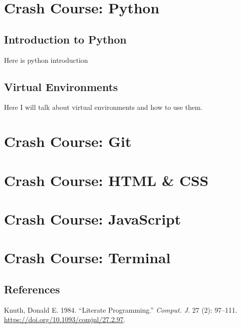 \documentclass[
  letterpaper,
  DIV=11,
  numbers=noendperiod]{scrreprt}
\newlength{\cslhangindent}
\newlength{\cslentryspacingunit} %
\newenvironment{CSLReferences}[2] %
 {%
  \setlength{\parindent}{0pt}
  \ifodd #1
  \let\oldpar\par
  \def\par{\hangindent=\cslhangindent\oldpar}
  \fi
  \setlength{\parskip}{#2\cslentryspacingunit}
 }%
 {}
\begin{document}
\part{Crash Course: Python}

\hypertarget{introduction-to-python}{%
\chapter{Introduction to Python}\label{introduction-to-python}}

Here is python introduction

\hypertarget{sec-virtual-environments}{%
\chapter{Virtual Environments}\label{sec-virtual-environments}}

Here I will talk about virtual environments and how to use them.

\part{Crash Course: Git}

\part{Crash Course: HTML \& CSS}

\part{Crash Course: JavaScript}

\part{Crash Course: Terminal}


\hypertarget{references}{%
\chapter*{References}\label{references}}


\hypertarget{refs}{}
\begin{CSLReferences}{1}{0}
\leavevmode{}%
Knuth, Donald E. 1984. {``Literate Programming.''} \emph{Comput. J.} 27
(2): 97--111. \url{https://doi.org/10.1093/comjnl/27.2.97}.

\end{CSLReferences}
\end{document}

